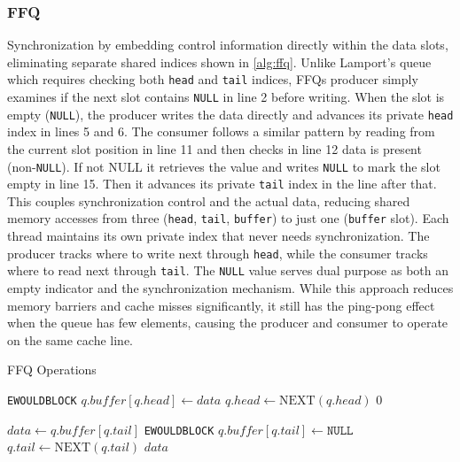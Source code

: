 \subsubsection{\acf{FFQ}}
Synchronization by embedding control information directly within the data slots, eliminating separate shared indices shown in \cref{alg:ffq}. Unlike Lamport's queue which requires checking both \texttt{head} and \texttt{tail} indices, \acsp{FFQ} producer simply examines if the next slot contains \texttt{NULL} in line 2 before writing. When the slot is empty (\texttt{NULL}), the producer writes the data directly and advances its private \texttt{head} index in lines 5 and 6. The consumer follows a similar pattern by reading from the current slot position in line 11 and then checks in line 12 data is present (non-\texttt{NULL}). If not NULL it retrieves the value and writes \texttt{NULL} to mark the slot empty in line 15. Then it advances its private \texttt{tail} index in the line after that. This couples synchronization control and the actual data, reducing shared memory accesses from three (\texttt{head}, \texttt{tail}, \texttt{buffer}) to just one (\texttt{buffer} slot). Each thread maintains its own private index that never needs synchronization. The producer tracks where to write next through \texttt{head}, while the consumer tracks where to read next through \texttt{tail}. The \texttt{NULL} value serves dual purpose as both an empty indicator and the synchronization mechanism. While this approach reduces memory barriers and cache misses significantly, it still has the ping-pong effect when the queue has few elements, causing the producer and consumer to operate on the same cache line. \cite{ffq} 

\begin{algorithm}[!ht]
    \centering
    \captionsetup{justification=centering}
    \caption{\ac{FFQ} Operations \cite{ffq}}
    \label{alg:ffq}
    \scriptsize
    \begin{algorithmic}[1]
                \State \Return \texttt{EWOULDBLOCK}
            \EndIf
            \State $q.buffer[q.head] \gets data$
            \State $q.head \gets \text{NEXT}(q.head)$
            \State \Return $0$
        \EndFunction
        
        \State
        
            \State $data \gets q.buffer[q.tail]$
                \State \Return \texttt{EWOULDBLOCK}
            \EndIf
            \State $q.buffer[q.tail] \gets \texttt{NULL}$
            \State $q.tail \gets \text{NEXT}(q.tail)$
            \State \Return $data$
        \EndFunction
    \end{algorithmic}
 \end{algorithm}

